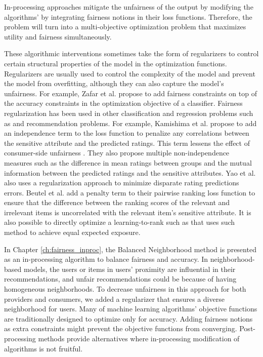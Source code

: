        In-processing approaches mitigate the unfairness of the output by modifying the algorithms' by integrating fairness notions in their loss functions. Therefore, the problem will turn into a multi-objective optimization problem that maximizes utility and fairness simultaneously.
        
        These algorithmic interventions sometimes take the form of regularizers to control certain structural properties of the model in the optimization functions. Regularizers are usually used to control the complexity of the model and prevent the model from overfitting, although they can also capture the model's unfairness. For example, Zafar et al. \cite{zafar2017fairness} propose to add fairness constraints on top of the accuracy constraints in the optimization objective of a classifier. Fairness regularization has been used in other classification and regression problems such as \cite{kamishima2012fairness,berk2017convex} and recommendation problems. For example, Kamishima et al. \cite{kamishima2018recommendation,kamishima-} propose to add an independence term to the loss function to penalize any correlations between the sensitive attribute and the predicted ratings. This term lessens the effect of consumer-side unfairness \cite{kamishima2017considerations}. They also propose multiple non-independence measures such as the difference in mean ratings between groups and the mutual information between the predicted ratings and the sensitive attributes. Yao et al. \cite{yao_huang_fatml-2017} also uses a regularization approach to minimize disparate rating predictions errors. Beutel et al. \cite{beutel2017data} add a penalty term to their pairwise ranking loss function to ensure that the difference between the ranking scores of the relevant and irrelevant items is uncorrelated with the relevant item's sensitive attribute. It is also possible to directly optimize a learning-to-rank such as \cite{diaz2020} that uses such method to achieve equal expected exposure.

        In Chapter \ref{ch:fairness_inproc}, the Balanced Neighborhood method is presented as an in-processing algorithm to balance fairness and accuracy. In neighborhood-based models, the users or items in users' proximity are influential in their recommendations, and unfair recommendations could be because of having homogeneous neighborhoods. To decrease unfairness in this approach for both providers and consumers, we added a regularizer that ensures a diverse neighborhood for users. Many of machine learning algorithms' objective functions are traditionally designed to optimize only for accuracy. Adding fairness notions as extra constraints might prevent the objective functions from converging. Post-processing methods provide alternatives where in-processing modification of algorithms is not fruitful.


